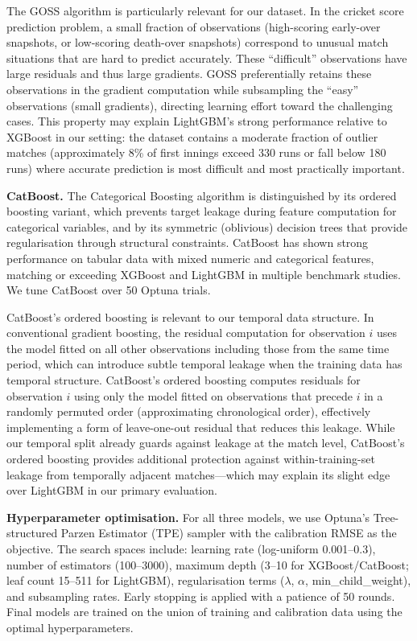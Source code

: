 \documentclass[10pt,a4paper,twocolumn]{article}
\begin{document}
The GOSS algorithm is particularly relevant for our dataset. In the cricket score prediction problem, a small fraction of observations (high-scoring early-over snapshots, or low-scoring death-over snapshots) correspond to unusual match situations that are hard to predict accurately. These ``difficult'' observations have large residuals and thus large gradients. GOSS preferentially retains these observations in the gradient computation while subsampling the ``easy'' observations (small gradients), directing learning effort toward the challenging cases. This property may explain LightGBM's strong performance relative to XGBoost in our setting: the dataset contains a moderate fraction of outlier matches (approximately 8\% of first innings exceed 330 runs or fall below 180 runs) where accurate prediction is most difficult and most practically important.

\textbf{CatBoost.} The Categorical Boosting algorithm \citep{Prokhorenkova2018} is distinguished by its ordered boosting variant, which prevents target leakage during feature computation for categorical variables, and by its symmetric (oblivious) decision trees that provide regularisation through structural constraints. CatBoost has shown strong performance on tabular data with mixed numeric and categorical features, matching or exceeding XGBoost and LightGBM in multiple benchmark studies. We tune CatBoost over 50 Optuna trials.

CatBoost's ordered boosting is relevant to our temporal data structure. In conventional gradient boosting, the residual computation for observation $i$ uses the model fitted on all other observations including those from the same time period, which can introduce subtle temporal leakage when the training data has temporal structure. CatBoost's ordered boosting computes residuals for observation $i$ using only the model fitted on observations that precede $i$ in a randomly permuted order (approximating chronological order), effectively implementing a form of leave-one-out residual that reduces this leakage. While our temporal split already guards against leakage at the match level, CatBoost's ordered boosting provides additional protection against within-training-set leakage from temporally adjacent matches---which may explain its slight edge over LightGBM in our primary evaluation.

\textbf{Hyperparameter optimisation.} For all three models, we use Optuna's Tree-structured Parzen Estimator (TPE) sampler \citep{Akiba2019} with the calibration RMSE as the objective. The search spaces include: learning rate (log-uniform 0.001--0.3), number of estimators (100--3000), maximum depth (3--10 for XGBoost/CatBoost; leaf count 15--511 for LightGBM), regularisation terms ($\lambda$, $\alpha$, min\_child\_weight), and subsampling rates. Early stopping is applied with a patience of 50 rounds. Final models are trained on the union of training and calibration data using the optimal hyperparameters.
\end{document}
